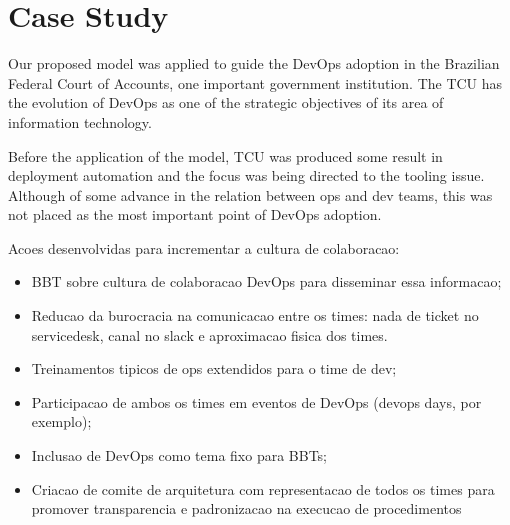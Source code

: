 \section{Case Study} \label{sec:case_study}

Our proposed model was applied to guide the DevOps adoption in the Brazilian Federal Court of Accounts, one important government institution. The TCU has the evolution of DevOps as one of the strategic objectives of its area of information technology.

Before the application of the model, TCU was produced some result in deployment automation and the focus was being directed to the tooling issue. Although of some advance in the relation between ops and dev teams, this was not placed as the most important point of DevOps adoption.

Acoes desenvolvidas para incrementar a cultura de colaboracao:
\begin{itemize}
\item BBT sobre cultura de colaboracao DevOps para disseminar essa informacao;
\item Reducao da burocracia na comunicacao entre os times: nada de ticket no servicedesk, canal no slack e aproximacao fisica dos times.
\item Treinamentos tipicos de ops extendidos para o time de dev;
\item Participacao de ambos os times em eventos de DevOps (devops days, por exemplo);
\item Inclusao de DevOps como tema fixo para BBTs;
\item Criacao de comite de arquitetura com representacao de todos os times para promover transparencia e padronizacao na execucao de procedimentos
\end{itemize}
